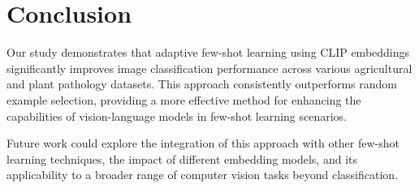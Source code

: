 \documentclass[12pt,a4paper]{article}
\begin{document}
\section{Conclusion}

Our study demonstrates that adaptive few-shot learning using CLIP embeddings significantly improves image classification performance across various agricultural and plant pathology datasets. This approach consistently outperforms random example selection, providing a more effective method for enhancing the capabilities of vision-language models in few-shot learning scenarios.

Future work could explore the integration of this approach with other few-shot learning techniques, the impact of different embedding models, and its applicability to a broader range of computer vision tasks beyond classification.
\end{document}
